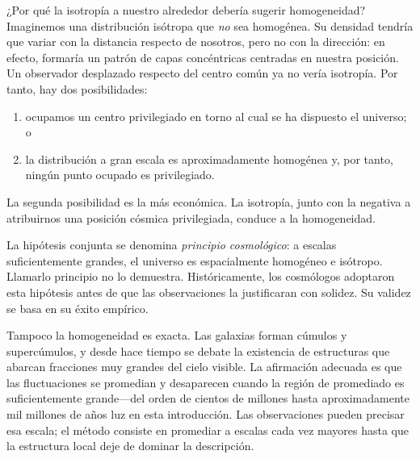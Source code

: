 ¿Por qué la isotropía a nuestro alrededor debería sugerir homogeneidad? Imaginemos una distribución isótropa que \emph{no} sea homogénea. Su densidad tendría que variar con la distancia respecto de nosotros, pero no con la dirección: en efecto, formaría un patrón de capas concéntricas centradas en nuestra posición. Un observador desplazado respecto del centro común ya no vería isotropía. Por tanto, hay dos posibilidades:
\begin{enumerate}
\item ocupamos un centro privilegiado en torno al cual se ha dispuesto el universo; o
\item la distribución a gran escala es aproximadamente homogénea y, por tanto, ningún punto ocupado es privilegiado.
\end{enumerate}
La segunda posibilidad es la más económica. La isotropía, junto con la negativa a atribuirnos una posición cósmica privilegiada, conduce a la homogeneidad.

\begin{classroomqa}
\end{classroomqa}

La hipótesis conjunta se denomina \emph{principio cosmológico}: a escalas suficientemente grandes, el universo es espacialmente homogéneo e isótropo. Llamarlo principio no lo demuestra. Históricamente, los cosmólogos adoptaron esta hipótesis antes de que las observaciones la justificaran con solidez. Su validez se basa en su éxito empírico.

Tampoco la homogeneidad es exacta. Las galaxias forman cúmulos y supercúmulos, y desde hace tiempo se debate la existencia de estructuras que abarcan fracciones muy grandes del cielo visible. La afirmación adecuada es que las fluctuaciones se promedian y desaparecen cuando la región de promediado es suficientemente grande---del orden de cientos de millones hasta aproximadamente mil millones de años luz en esta introducción. Las observaciones pueden precisar esa escala; el método consiste en promediar a escalas cada vez mayores hasta que la estructura local deje de dominar la descripción.

